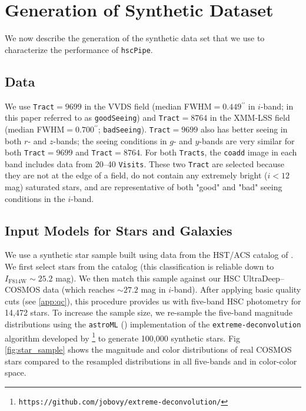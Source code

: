 \documentclass[useamsfonts]{pasj01}
\def\asec{$^{\prime\prime}$}
\def\hscpipe{\texttt{hscPipe}}
\def\coadd{\texttt{coadd}}
\def\tract{\texttt{Tract}}
\def\tracts{\texttt{Tracts}}
\def\visits{\texttt{Visits}}
\begin{document}
\section{Generation of Synthetic Dataset}
    \label{sec:test}
    
    We now describe the  generation of the synthetic data set that we use to characterize the performance of \hscpipe{}.

\subsection{Data}
    We use \tract{}$=9699$ in the VVDS field (median FWHM$=0.449$\asec{} in $i$-band;
    in this paper referred to as \texttt{goodSeeing}) and
    \tract{}$=8764$ in the XMM-LSS field (median FWHM$=0.700$\asec{};
    \texttt{badSeeing}).
    \tract{}$=9699$ also has better seeing in both $r$- and $z$-bands;
    the seeing conditions in $g$- and $y$-bands are very similar for both
    \tract{}$=9699$ and \tract{}$=8764$.
    For both \tracts{}, the \coadd{} image in each band includes data from
    20--40 \visits{}.  These  two \tract{} are selected  because they are not at the edge of a field, do not contain any  extremely bright ($i<12$ mag) saturated stars, and  are representative of both "good" and "bad" seeing conditions in the $i$-band.


\subsection{Input Models for Stars and Galaxies}
    \label{ssec:inputs}

We use a synthetic star sample built using data from  the HST/ACS catalog of \citet{Leauthaud2007}.  We first select stars from the  \citet{Leauthaud2007} catalog (this classification is reliable down to $I_{\mathrm{F814W}}{\sim}25.2$ mag). We then match this sample against our HSC UltraDeep--COSMOS data (which reaches ${\sim}27.2$ mag in $i$-band). After applying basic quality cuts (see \ref{app:qc}), this procedure  provides us with five-band HSC photometry for 14,472 stars. To increase the sample size, we re-sample the five-band magnitude distributions using the \texttt{astroML} (\citealt{astroml}) implementation of the \texttt{extreme-deconvolution} algorithm developed by
    \citet{Bovy2011}
    \footnote{\texttt{https://github.com/jobovy/extreme-deconvolution/}} to
    generate 100,000 synthetic stars. Fig \ref{fig:star_sample} shows the magnitude and color distributions of real COSMOS stars compared to the resampled distributions in all
    five-bands and in color-color space.
\end{document}
